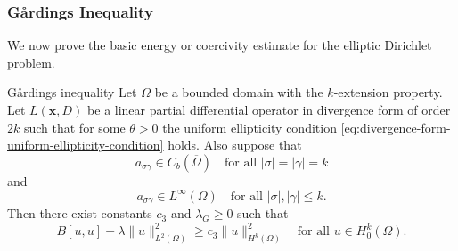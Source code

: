 \subsubsection{Gårding\textquotesingle s Inequality}\label{subsec:elliptic-garding-inequality}

We now prove the basic energy or coercivity estimate for the elliptic Dirichlet problem.

\begin{Theorem}{Gårding\textquotesingle s inequality}
\label{thm:garding-elliptic-energy-inequality}
Let $\Omega$ be a bounded domain with the $k$-extension property. Let $L(\bm{x},D)$ be a linear partial differential operator in divergence form of order $2k$ such that for some $\theta>0$ the uniform ellipticity condition \eqref{eq:divergence-form-uniform-ellipticity-condition} holds. Also suppose that
\begin{equation}\label{eq:garding-principal-coefficient-continuity}
a_{\sigma\gamma}\in C_b(\overline\Omega)\quad\text{for all }|\sigma|=|\gamma|=k
\end{equation}
and
\begin{equation}\label{eq:garding-lower-coefficient-boundedness}
a_{\sigma\gamma}\in L^\infty(\Omega)\quad\text{for all }|\sigma|,|\gamma|\leq k.
\end{equation}
Then there exist constants $c_3$ and $\lambda_G\geq0$ such that
\begin{equation}\label{eq:garding-elliptic-energy-inequality}
B[u,u]+\lambda\|u\|_{L^2(\Omega)}^2\geq c_3\|u\|_{H^k(\Omega)}^2\quad\text{for all }u\in H_0^k(\Omega).
\end{equation}

\end{Theorem}

